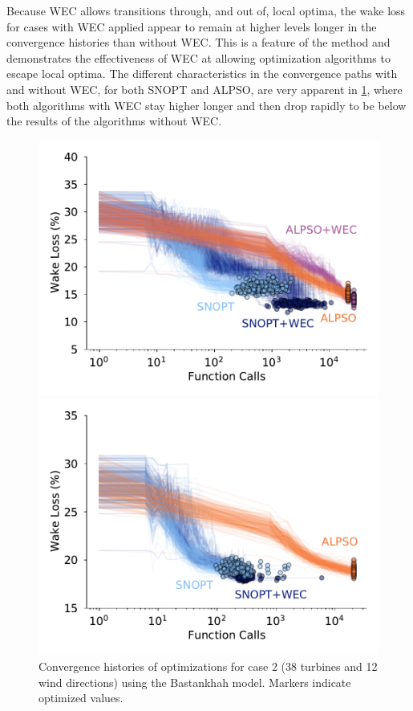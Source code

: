 \documentclass{jpconf}
\begin{document}
Because WEC allows transitions through, and out of, local optima, the wake loss for cases with WEC applied appear to remain at higher levels longer in the convergence histories than without WEC. This is a feature of the method and demonstrates the effectiveness of WEC at allowing optimization algorithms to escape local optima. The different characteristics in the convergence paths with and without WEC, for both SNOPT and ALPSO, are very apparent in \cref{fig:case-2-histories}, where both algorithms with WEC stay higher longer and then drop rapidly to be below the results of the algorithms without WEC.

\begin{figure}[h!]
	\centering
	\begin{minipage}[t]{.45\textwidth}
		\centering
		\includegraphics[width=\textwidth]{final_images/results/convergence_history_BPAmodel_38turbs_12dirs}  
		\caption{Convergence histories of optimizations for case 2 (38 turbines and 12 wind directions) using the Bastankhah model. Markers indicate optimized values.}
		\label{fig:case-2-histories}
	\end{minipage}\hspace{1pc}
	\begin{minipage}[t]{0.45\textwidth}
		\centering
		\includegraphics[width=\textwidth]{final_images/results/convergence_history_JENSENmodel_38turbs_12dirs}  

\end{minipage}
\end{figure}
\end{document}
